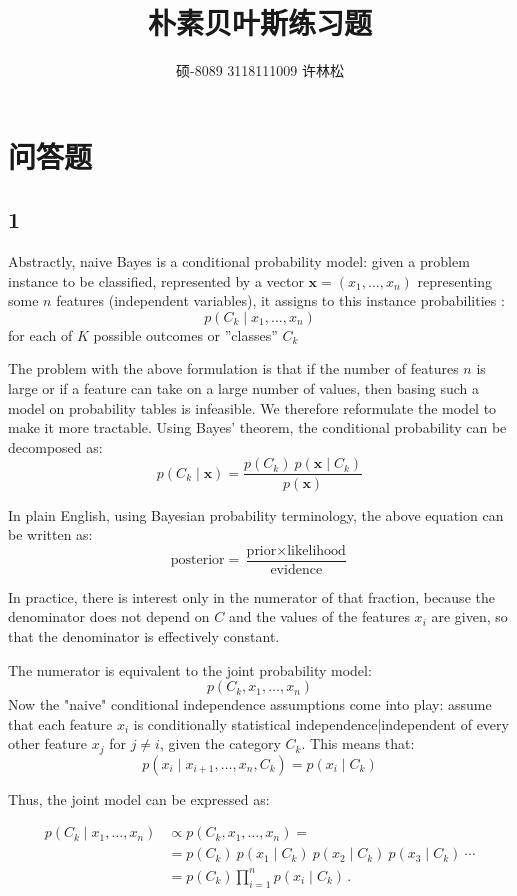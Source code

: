 \documentclass[letterpaper, 10 pt, conference]{ieeeconf}
\title{\LARGE \bf
朴素贝叶斯练习题
}
\author{硕-8089 3118111009 许林松%
}
\begin{document}
\maketitle
\thispagestyle{empty}
\pagestyle{empty}



\section{问答题}


\subsection*{1}

Abstractly, naive Bayes is a conditional probability model: given a problem instance to be classified, represented by a vector $\mathbf{x} = (x_1, \dots, x_n)$ representing some $n$ features (independent variables), it assigns to this instance probabilities
:$$p(C_k \mid x_1, \dots, x_n)$$for each of $K$ possible outcomes or ''classes'' $C_k$

The problem with the above formulation is that if the number of features $n$ is large or if a feature can take on a large number of values, then basing such a model on probability tables is infeasible.  We therefore reformulate the model to make it more tractable.  Using Bayes' theorem, the conditional probability can be decomposed as:$$p(C_k \mid \mathbf{x}) = \frac{p(C_k) \ p(\mathbf{x} \mid C_k)}{p(\mathbf{x})}$$

In plain English, using Bayesian probability terminology, the above equation can be written as:$$\mbox{posterior} = \frac{\mbox{prior} \times \mbox{likelihood}}{\mbox{evidence}}$$

In practice, there is interest only in the numerator of that fraction, because the denominator does not depend on $C$ and the values of the features $x_i$ are given, so that the denominator is effectively constant.

The numerator is equivalent to the joint probability model:$$p(C_k, x_1, \dots, x_n)$$
Now the "naive" conditional independence assumptions come into play: assume that each feature $x_i$ is conditionally statistical independence|independent of every other feature $x_j$ for $j\neq i$, given the category $C_k$.  This means that:$$p(x_i \mid x_{i+1}, \dots ,x_{n}, C_k ) = p(x_i \mid C_k)$$

Thus, the joint model can be expressed as:

\begin{align*}
    p(C_k \mid x_1, \dots, x_n) & \propto p(C_k, x_1, \dots, x_n) = \\
                            & = p(C_k) \ p(x_1 \mid C_k) \ p(x_2\mid C_k) \ p(x_3\mid C_k) \ \cdots \\
                            & = p(C_k) \prod_{i=1}^n p(x_i \mid C_k)\,.
\end{align*}
\end{document}
